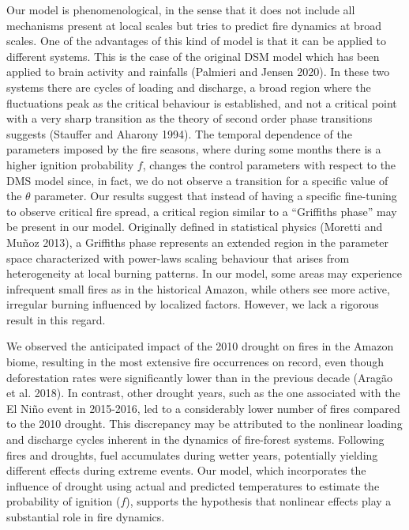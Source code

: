 \documentclass[
]{article}
\begin{document}
Our model is phenomenological, in the sense that it does not include all
mechanisms present at local scales but tries to predict fire dynamics at
broad scales. One of the advantages of this kind of model is that it can
be applied to different systems. This is the case of the original DSM
model which has been applied to brain activity and rainfalls (Palmieri
and Jensen 2020). In these two systems there are cycles of loading and
discharge, a broad region where the fluctuations peak as the critical
behaviour is established, and not a critical point with a very sharp
transition as the theory of second order phase transitions suggests
(Stauffer and Aharony 1994). The temporal dependence of the parameters
imposed by the fire seasons, where during some months there is a higher
ignition probability \(f\), changes the control parameters with respect
to the DMS model since, in fact, we do not observe a transition for a
specific value of the \(\theta\) parameter. Our results suggest that
instead of having a specific fine-tuning to observe critical fire
spread, a critical region similar to a ``Griffiths phase'' may be
present in our model. Originally defined in statistical physics (Moretti
and Muñoz 2013), a Griffiths phase represents an extended region in the
parameter space characterized with power-laws scaling behaviour that
arises from heterogeneity at local burning patterns. In our model, some
areas may experience infrequent small fires as in the historical Amazon,
while others see more active, irregular burning influenced by localized
factors. However, we lack a rigorous result in this regard.

We observed the anticipated impact of the 2010 drought on fires in the
Amazon biome, resulting in the most extensive fire occurrences on
record, even though deforestation rates were significantly lower than in
the previous decade (Aragão et al. 2018). In contrast, other drought
years, such as the one associated with the El Niño event in 2015-2016,
led to a considerably lower number of fires compared to the 2010
drought. This discrepancy may be attributed to the nonlinear loading and
discharge cycles inherent in the dynamics of fire-forest systems.
Following fires and droughts, fuel accumulates during wetter years,
potentially yielding different effects during extreme events. Our model,
which incorporates the influence of drought using actual and predicted
temperatures to estimate the probability of ignition (\(f\)), supports
the hypothesis that nonlinear effects play a substantial role in fire
dynamics.
\end{document}
